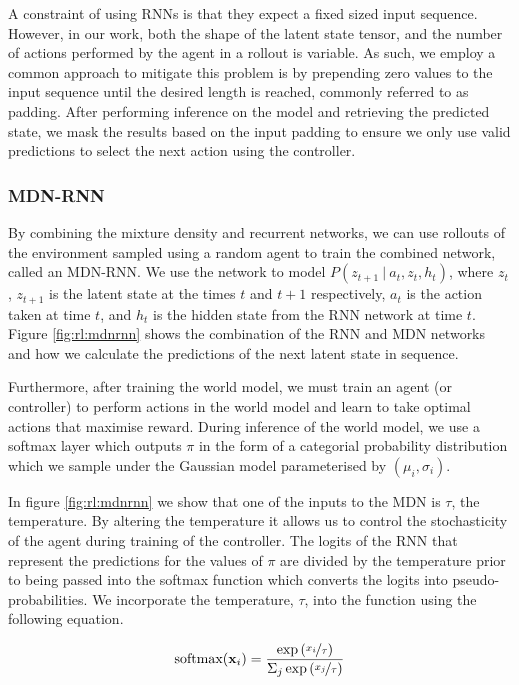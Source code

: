 A constraint of using RNNs is that they expect a fixed sized input sequence. However, in our work, both the shape of the latent state tensor, and the number of actions performed by the agent in a rollout is variable. As such, we employ a common approach to mitigate this problem is by prepending zero values to the input sequence until the desired length is reached, commonly referred to as padding. After performing inference on the model and retrieving the predicted state, we mask the results based on the input padding to ensure we only use valid predictions to select the next action using the controller.

\subsubsection{MDN-RNN}

By combining the mixture density and recurrent networks, we can use rollouts of the environment sampled using a random agent to train the combined network, called an MDN-RNN. We use the network to model $P(z_{t+1}~|~a_t, z_t, h_t)$, where $z_t$, $z_{t+1}$ is the latent state at the times $t$ and $t+1$ respectively, $a_t$ is the action taken at time $t$, and $h_t$ is the hidden state from the RNN network at time $t$. Figure \ref{fig:rl:mdnrnn} shows the combination of the RNN and MDN networks and how we calculate the predictions of the next latent state in sequence.

Furthermore, after training the world model, we must train an agent (or controller) to perform actions in the world model and learn to take optimal actions that maximise reward. During inference of the world model, we use a softmax layer which outputs $\pi$ in the form of a categorial probability distribution which we sample under the Gaussian model parameterised by $(\mu_i, \sigma_i)$.

In figure \ref{fig:rl:mdnrnn} we show that one of the inputs to the MDN is $\tau$, the temperature. By altering the temperature it allows us to control the stochasticity of the agent during training of the controller. The logits of the RNN that represent the predictions for the values of $\pi$ are divided by the temperature prior to being passed into the softmax function which converts the logits into pseudo-probabilities. We incorporate the temperature, $\tau$, into the function using the following equation.

$$
\text{softmax}(\mathbf{x}_i) = \frac{\exp\left( \nicefrac{x_i}{\tau} \right) }{\Sigma_j \exp \left( \nicefrac{x_j}{\tau} \right) }
$$

